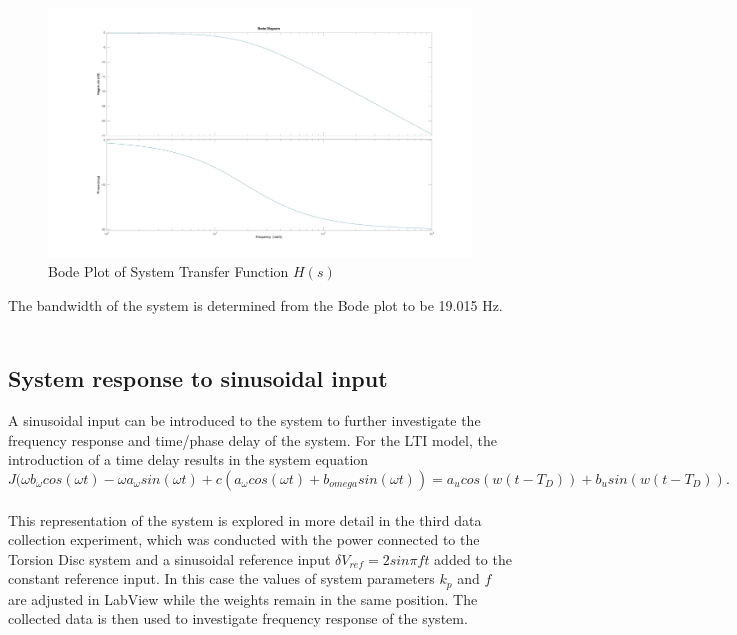 \documentclass[11pt,titlepage]{article}
\begin{document}
	\begin{figure}[h!]
		\centering
		\includegraphics[trim={6cm 0 0 0},clip,angle=0,origin=c,scale=0.2]{bode_Hs}
		\caption{Bode Plot of System Transfer Function $H(s)$}
		\label{fig:bode_Hs}
	\end{figure}
	The bandwidth of the system is determined from the Bode plot to be 19.015 Hz.\\\\
	
	\subsection{System response to sinusoidal input}
	A sinusoidal input can be introduced to the system to further investigate the frequency response and time/phase delay of the system. For the LTI model, the introduction of a time delay results in the system equation 
	\begin{equation}
		J(\omega b_{\omega}cos(\omega t)-\omega a_{\omega}sin(\omega t)+c(a_{\omega}cos(\omega t)+b_{omega}sin(\omega t)) = a_ucos(w(t-T_D))+b_usin(w(t-T_D)).
	\end{equation}
	\\
	This representation of the system is explored in more detail in the third data collection experiment, which was conducted with the power connected to the Torsion Disc system and a sinusoidal reference input $\delta V_{ref}=2sin\pi ft$ added to the constant reference input. In this case the values of system parameters $k_p$ and $f$ are adjusted in LabView while the weights remain in the same position. The collected data is then used to investigate frequency response of the system.
\end{document}
